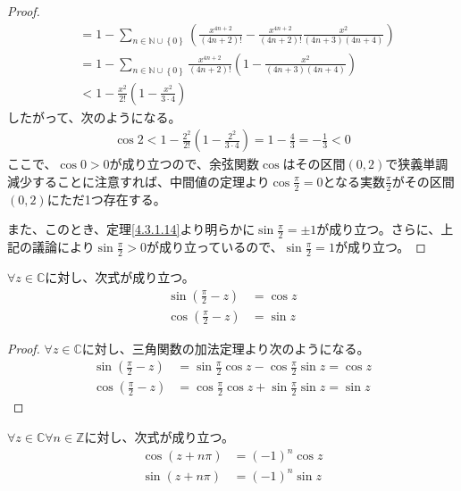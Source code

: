 \documentclass[dvipdfmx]{jsarticle}
\begin{document}
\begin{proof}
\begin{align*}
&= 1 - \sum_{n \in \mathbb{N} \cup \left\{ 0 \right\}} \left( \frac{x^{4n + 2}}{(4n + 2)!} - \frac{x^{4n + 2}}{(4n + 2)!}\frac{x^{2}}{(4n + 3)(4n + 4)} \right)\\
&= 1 - \sum_{n \in \mathbb{N} \cup \left\{ 0 \right\}} {\frac{x^{4n + 2}}{(4n + 2)!}\left( 1 - \frac{x^{2}}{(4n + 3)(4n + 4)} \right)}\\
&< 1 - \frac{x^{2}}{2!}\left( 1 - \frac{x^{2}}{3 \cdot 4} \right)
\end{align*}
したがって、次のようになる。
\begin{align*}
\cos 2 < 1 - \frac{2^{2}}{2!}\left( 1 - \frac{2^{2}}{3 \cdot 4} \right) = 1 - \frac{4}{3} = - \frac{1}{3} < 0
\end{align*}
ここで、$\cos 0 > 0$が成り立つので、余弦関数$\cos$はその区間$(0,2)$で狭義単調減少することに注意すれば、中間値の定理より$\cos\frac{\pi}{2} = 0$となる実数$\frac{\pi}{2}$がその区間$(0,2)$にただ1つ存在する。\par
また、このとき、定理\ref{4.3.1.14}より明らかに$\sin\frac{\pi}{2} = \pm 1$が成り立つ。さらに、上記の議論により$\sin\frac{\pi}{2} > 0$が成り立っているので、$\sin\frac{\pi}{2} = 1$が成り立つ。
\end{proof}
\begin{thm}\label{4.3.1.20} $\forall z \in \mathbb{C}$に対し、次式が成り立つ。
\begin{align*}
\sin\left( \frac{\pi}{2} - z \right) &= \cos z\\
\cos\left( \frac{\pi}{2} - z \right) &= \sin z
\end{align*}
\end{thm}
\begin{proof}
$\forall z \in \mathbb{C}$に対し、三角関数の加法定理より次のようになる。
\begin{align*}
\sin\left( \frac{\pi}{2} - z \right) &= \sin\frac{\pi}{2}\cos z - \cos\frac{\pi}{2}\sin z = \cos z\\
\cos\left( \frac{\pi}{2} - z \right) &= \cos\frac{\pi}{2}\cos z + \sin\frac{\pi}{2}\sin z = \sin z
\end{align*}
\end{proof}
\begin{thm}\label{4.3.1.21}
$\forall z \in \mathbb{C}\forall n \in \mathbb{Z}$に対し、次式が成り立つ。
\begin{align*}
\cos(z + n\pi) &= ( - 1)^{n}\cos z\\
\sin(z + n\pi) &= ( - 1)^{n}\sin z
\end{align*}
\end{thm}
\end{document}
